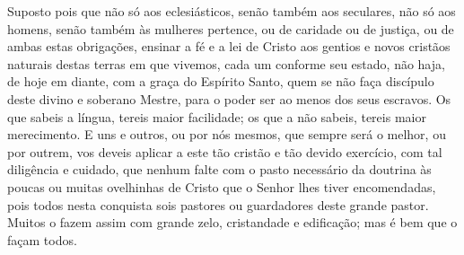 Suposto pois que não só aos eclesiásticos, senão também aos seculares,
não só aos homens, senão também às mulheres pertence, ou de caridade ou
de justiça, ou de ambas estas obrigações, ensinar a fé e a lei de Cristo
aos gentios e novos
cristãos naturais destas terras em que vivemos, cada um conforme seu
estado, não haja, de hoje em diante, com a graça do Espírito Santo, quem
se não faça discípulo deste divino e soberano Mestre, para o poder ser
ao menos dos seus escravos. Os que sabeis a língua, tereis maior
facilidade; os que a não sabeis, tereis maior merecimento. E uns e
outros, ou por nós mesmos, que sempre será o melhor, ou por
outrem, vos deveis aplicar a este tão cristão e tão devido exercício,
com tal diligência e cuidado, que nenhum falte com o pasto necessário da
doutrina às poucas ou muitas ovelhinhas de Cristo que o Senhor lhes
tiver encomendadas, pois todos nesta conquista sois pastores ou
guardadores deste grande pastor. Muitos o fazem assim com grande zelo,
cristandade e edificação; mas é bem que o façam todos.


